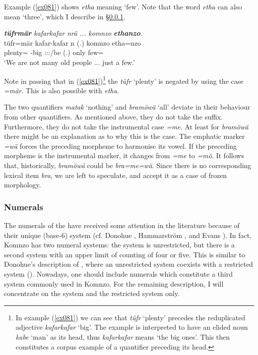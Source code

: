 Example (\ref{ex081}) shows \emph{etha} meaning `few'. Note that the word \emph{etha} can also mean `three', which I describe in {\S}\ref{numerals-subsec}.

\begin{exe}
	\ex \emph{\textbf{tüfrmär} kafarkafar nrä ... komnzo \textbf{ethanzo}.}\\
	\gll tüfr=mär kafar-kafar n (.) komnzo etha=nzo\\
	plenty={\Priv} \Redup-big \Fpl:\Sbj:\Nonpast:\Ipfv/be (.) only few={\Only}\\
	\trans `We are not many old people ... just a few.' 
	\label{ex081}
\end{exe}

Note in passing that in (\ref{ex081})\footnote{\label{foot1}In example (\ref{ex081}) we can see that \emph{tüfr} `plenty' precedes the reduplicated adjective \emph{kafarkafar} `big'. The example is interpreted to have an elided noun \emph{kabe} `man' as its head, thus \emph{kafarkafar} means `the big ones'. This then constitutes a corpus example of a quantifier preceding its head.} the  \emph{tüfr} `plenty' is negated by using the  case \emph{=mär}. This is also possible with \emph{etha}.

The two quantifiers \emph{matak} `nothing' and \emph{bramöwä} `all' deviate in their behaviour from other quantifiers. As mentioned above, they do not take the  suffix. Furthermore, they do not take the instrumental case \emph{=me}. At least for \emph{bramöwä} there might be an explanation as to why this is the case. The emphatic marker \emph{=wä} forces the preceding morpheme to harmonise its vowel. If the preceding morpheme is the instrumental marker, it changes from \emph{=me} to \emph{=mö}. It follows that, historically, \emph{bramöwä} could be \emph{bra=me=wä}. Since there is no corresponding lexical item \emph{bra}, we are left to speculate, and accept it as a case of frozen morphology.

\subsubsection{Numerals} \label{numerals-subsec}

The numerals of the  have received some attention in the literature because of their unique  (base-6) system (cf. Donohue \citeyear{Donohue:2008bn}, Hammarström \citeyear{Hammarstrom:2009bp}, and Evans \citeyear{Evans:2009wg}). In fact, Komnzo has two numeral systems: the  system is unrestricted, but there is a second system with an upper limit of counting of four or five. This is similar to Donohue's description of , where an unrestricted system coexists with a restricted system (\citealt{Donohue:2008bn}). Nowadays, one should include  numerals which constitute a third system commonly used in Komnzo. For the remaining description, I will concentrate on the  system and the restricted system only.

